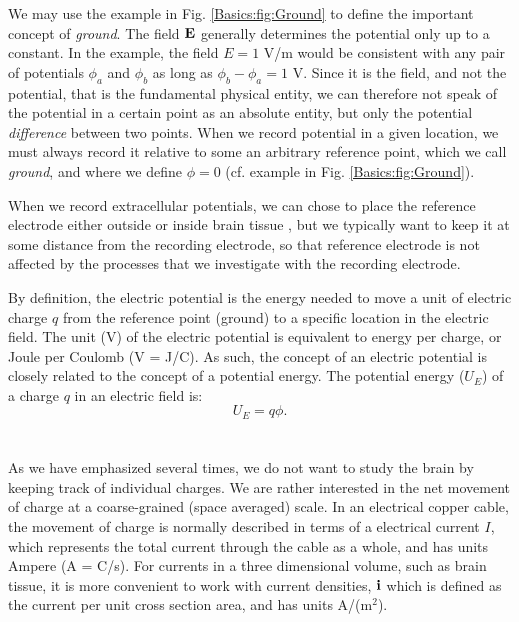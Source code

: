 We may use the example in Fig. \ref{Basics:fig:Ground} to define the important concept of \textit{ground}. The field ${\bf E}$ generally determines the potential only up to a constant. In the example, the field $E = 1$ V/m would be consistent with any pair of potentials $\phi_a$ and $\phi_b$ as long as $\phi_b - \phi_a =  1$ V. Since it is the field, and not the potential, that is the fundamental physical entity, we can therefore not speak of the potential in a certain point as an absolute entity, but only the potential \textit{difference} between two points. When we record potential in a given location, we must always record it relative to some an arbitrary reference point, which we call \textit{ground}, and where we define $\phi = 0$ (cf. example in Fig. \ref{Basics:fig:Ground}). 

When we record extracellular potentials, we can chose to place the reference electrode either outside or inside brain tissue \cite{Sharott2015}, but we typically want to keep it at some distance from the recording electrode, so that reference electrode is not affected by the processes that we investigate with the recording electrode. 

By definition, the electric potential is the energy needed to move a unit of electric charge $q$ from the reference point (ground) to a specific location in the electric field. The unit (V) of the electric potential is equivalent to energy per charge, or Joule per Coulomb (V = J/C). As such, the concept of an electric potential is closely related to the concept of a potential energy. The potential energy ($U_E$) of a charge $q$ in an electric field is:
\begin{equation}
U_E = q\phi.
\label{Basics:eq:UE}
\end{equation}


\section{}
\label{sec:Basics:Current} 
As we have emphasized several times, we do not want to study the brain by keeping track of individual charges. We are rather interested in the net movement of charge at a coarse-grained (space averaged) scale. In an electrical copper cable, the movement of charge is normally described in terms of a electrical current $I$, which represents the total current through the cable as a whole, and has units Ampere (A = C/s). For currents in a three dimensional volume, such as brain tissue, it is more convenient to work with current densities, ${\bf i}$  which is defined as the current per unit cross section area, and has units A/(m$^2$).

